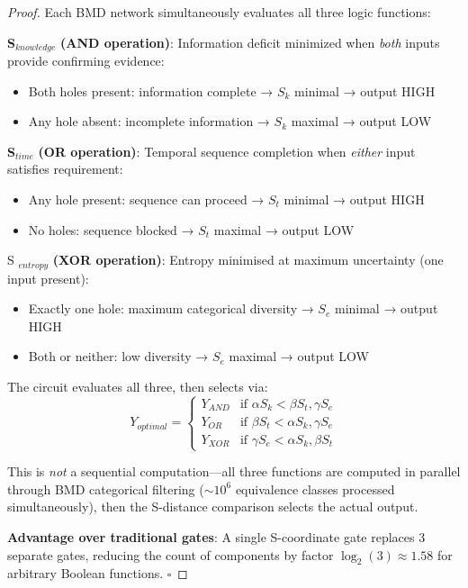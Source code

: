 \documentclass[11pt,a4paper]{article}
\begin{document}
\begin{proof}
Each BMD network simultaneously evaluates all three logic functions:

\textbf{S}$_{knowledge}$ \textbf{(AND operation)}: Information deficit minimized when \textit{both} inputs provide confirming evidence:
\begin{itemize}
\item Both holes present: information complete → $S_k$ minimal → output HIGH
\item Any hole absent: incomplete information → $S_k$ maximal → output LOW
\end{itemize}

\textbf{S}$_{time}$ \textbf{(OR operation)}: Temporal sequence completion when \textit{either} input satisfies requirement:
\begin{itemize}
\item Any hole present: sequence can proceed → $S_t$ minimal → output HIGH  
\item No holes: sequence blocked → $S_t$ maximal → output LOW
\end{itemize}

S $_{entropy}$ \textbf{(XOR operation)}: Entropy minimised at maximum uncertainty (one input present):
\begin{itemize}
\item Exactly one hole: maximum categorical diversity → $S_e$ minimal → output HIGH
\item Both or neither: low diversity → $S_e$ maximal → output LOW
\end{itemize}

The circuit evaluates all three, then selects via:
\begin{equation}
Y_{optimal} = \begin{cases}
Y_{AND} & \text{if } \alpha S_k < \beta S_t, \gamma S_e \\
Y_{OR} & \text{if } \beta S_t < \alpha S_k, \gamma S_e \\
Y_{XOR} & \text{if } \gamma S_e < \alpha S_k, \beta S_t
\end{cases}
\end{equation}

This is \textit{not} a sequential computation—all three functions are computed in parallel through BMD categorical filtering ($\sim 10^6$ equivalence classes processed simultaneously), then the S-distance comparison selects the actual output.

\textbf{Advantage over traditional gates}: A single S-coordinate gate replaces 3 separate gates, reducing the count of components by factor $\log_2(3) \approx 1.58$ for arbitrary Boolean functions. $\square$
\end{proof}
\end{document}
